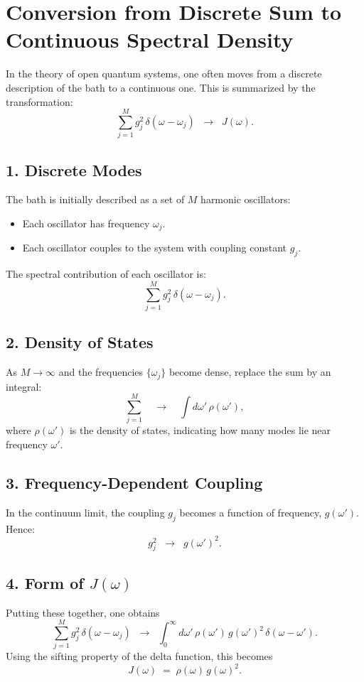 \newpage
\section*{Conversion from Discrete Sum to Continuous Spectral Density}

\noindent In the theory of open quantum systems, one often moves from a discrete description of the bath to a continuous one. This is summarized by the transformation:
\[
\sum_{j=1}^{M} g_j^2 \,\delta(\omega - \omega_j)
\;\;\longrightarrow\;\;
J(\omega).
\]

\subsection*{1. Discrete Modes}
The bath is initially described as a set of $M$ harmonic oscillators:
\begin{itemize}
  \item Each oscillator has frequency $\omega_j$.
  \item Each oscillator couples to the system with coupling constant $g_j$.
\end{itemize}
The spectral contribution of each oscillator is:
\[
\sum_{j=1}^{M} g_j^2\,\delta(\omega - \omega_j).
\]

\subsection*{2. Density of States}
As $M \to \infty$ and the frequencies $\{\omega_j\}$ become dense, replace the sum by an integral:
\[
\sum_{j=1}^{M} \quad \longrightarrow \quad \int d\omega'\,\rho(\omega'),
\]
where $\rho(\omega')$ is the density of states, indicating how many modes lie near frequency $\omega'$.

\subsection*{3. Frequency-Dependent Coupling}
In the continuum limit, the coupling $g_j$ becomes a function of frequency, $g(\omega')$. Hence:
\[
g_j^2 \;\;\longrightarrow\;\; g(\omega')^2.
\]

\subsection*{4. Form of $J(\omega)$}
Putting these together, one obtains
\[
\sum_{j=1}^{M} g_j^2\,\delta(\omega - \omega_j)
\;\;\longrightarrow\;\;
\int_{0}^{\infty} d\omega'\,\rho(\omega')\,g(\omega')^2\,\delta(\omega - \omega').
\]
Using the sifting property of the delta function, this becomes
\[
J(\omega) \;=\; \rho(\omega)\,g(\omega)^2.
\]

